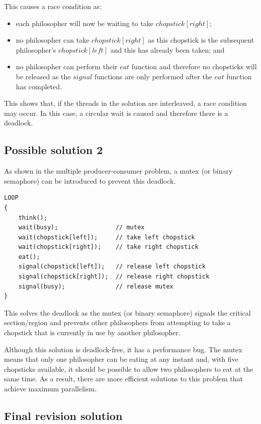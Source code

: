 \documentclass[a4paper]{systems-software}
\begin{document}
This causes a race condition as:
\begin{itemize}
	\item each philosopher will now be waiting to take $chopstick[right]$;
	\item no philosopher can take $chopstick[right]$ as this chopstick is the subsequent philosopher’s $chopstick[left]$ and this has already been taken; and
	\item no philosopher can perform their $eat$ function and therefore no chopsticks will be released as the $signal$ functions are only performed after the $eat$ function has completed.
\end{itemize}

This shows that, if the threads in the solution are interleaved, a race condition may occur. In this case, a circular wait is caused and therefore there is a deadlock.


\subsection*{Possible solution 2}

As shown in the multiple producer-consumer problem, a mutex (or binary semaphore) can be introduced to prevent this deadlock.

\begin{lstlisting}[title={Producer class}]
LOOP
{
	think();
	wait(busy);                // mutex
	wait(chopstick[left]);     // take left chopstick
	wait(chopstick[right]);    // take right chopstick
	eat();
	signal(chopstick[left]);   // release left chopstick
	signal(chopstick[right]);  // release right chopstick
	signal(busy);              // release mutex
}
\end{lstlisting}

This solves the deadlock as the mutex (or binary semaphore) signals the critical section/region and prevents other philosophers from attempting to take a chopstick that is currently in use by another philosopher.

Although this solution is deadlock-free, it has a performance bug. The mutex means that only one philosopher can be eating at any instant and, with five chopsticks available, it should be possible to allow two philosophers to eat at the same time. As a result, there are more efficient solutions to this problem that achieve maximum parallelism.

\subsection*{Final revision solution}
\end{document}
